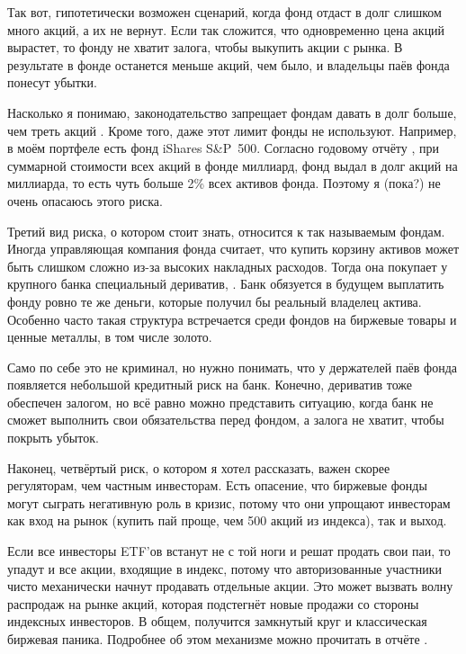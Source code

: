 Так вот, гипотетически возможен сценарий, когда фонд отдаст в долг слишком много 
акций, а их не вернут. Если так сложится, что одновременно цена акций вырастет, 
то фонду не хватит залога, чтобы выкупить акции с рынка. В результате в фонде 
останется меньше акций, чем было, и владельцы паёв фонда понесут убытки.

Насколько я понимаю, законодательство запрещает фондам давать в долг больше, 
чем треть акций \cite{wsj2011lending}. Кроме того, даже этот лимит фонды не 
используют. Например, в моём портфеле есть фонд iShares S\&P~500. Согласно 
годовому отчёту \cite{ishares2020report}, при суммарной стоимости всех акций в 
фонде  миллиард, фонд выдал в долг акций на  
миллиарда, то есть чуть больше 2\% всех активов фонда. Поэтому я (пока?) не 
очень опасаюсь этого риска.

Третий вид риска, о котором стоит знать, относится к так называемым 
 фондам. Иногда управляющая компания фонда 
считает, что купить корзину активов может быть слишком сложно из-за высоких 
накладных расходов. Тогда она покупает у крупного банка специальный дериватив, 
. Банк обязуется в будущем 
выплатить фонду ровно те же деньги, которые получил бы реальный владелец актива. 
Особенно часто такая структура встречается среди фондов на биржевые товары и 
ценные металлы, в том числе золото.

Само по себе это не криминал, но нужно понимать, что у держателей паёв фонда 
появляется небольшой кредитный риск на банк. Конечно, дериватив тоже обеспечен 
залогом, но всё равно можно представить ситуацию, когда банк не сможет выполнить 
свои обязательства перед фондом, а залога не хватит, чтобы покрыть убыток.

Наконец, четвёртый риск, о котором я хотел рассказать, важен скорее регуляторам, 
чем частным инвесторам. Есть опасение, что биржевые фонды могут сыграть 
негативную роль в кризис, потому что они упрощают инвесторам как вход на рынок 
(купить пай проще, чем 500 акций из индекса), так и выход.

Если все инвесторы ETF'ов встанут не с той ноги и решат продать свои паи, то 
упадут и все акции, входящие в индекс, потому что авторизованные участники чисто 
механически начнут продавать отдельные акции. Это может вызвать волну распродаж 
на рынке акций, которая подстегнёт новые продажи со стороны индексных 
инвесторов. В общем, получится замкнутый круг и классическая биржевая паника. 
Подробнее об этом механизме можно прочитать в отчёте \cite{pagano2019can}.


